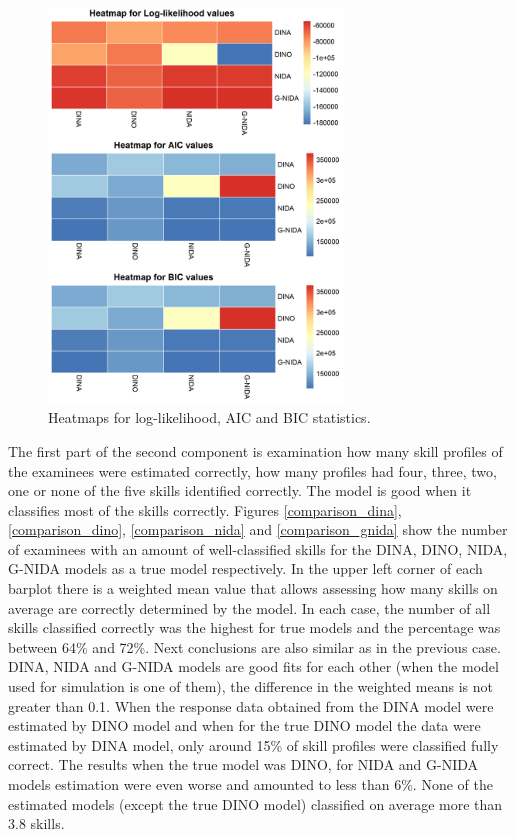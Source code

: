 \documentclass[english]{pwr_wmat_praca_dyplomowa}
\theoremstyle{plain}
\theoremstyle{definition}
\numberwithin{theorem}{chapter}
\begin{document}
\begin{figure}[h!]
	\centering
	\includegraphics[width=0.7\textwidth]{Heatmaps_relative_fit.png}
	\caption{Heatmaps for log-likelihood, AIC and BIC statistics.}
	\label{heatmap_stats}
\end{figure}

The first part of the second component is examination how many skill profiles of the examinees were estimated correctly, how many profiles had four, three, two, one or none of the five skills identified correctly. The model is good when it classifies most of the skills correctly. Figures \ref{comparison_dina}, \ref{comparison_dino}, \ref{comparison_nida} and \ref{comparison_gnida} show the number of examinees with an amount of well-classified skills for the DINA, DINO, NIDA, G-NIDA models as a true model respectively. In the upper left corner of each barplot there is a weighted mean value that allows assessing how many skills on average are correctly determined by the model. In each case, the number of all skills classified correctly was the highest for true models and the percentage was between 64\% and 72\%. Next conclusions are also similar as in the previous case. DINA, NIDA and G-NIDA models are good fits for each other (when the model used for simulation is one of them), the difference in the weighted means is not greater than 0.1. When the response data obtained from the DINA model were estimated by DINO model and when for the true DINO model the data were estimated by DINA model, only around 15\% of skill profiles were classified fully correct. The results when the true model was DINO, for NIDA and G-NIDA models estimation were even worse and amounted to less than 6\%. None of the estimated models (except the true DINO model) classified on average more than 3.8 skills.
\end{document}
